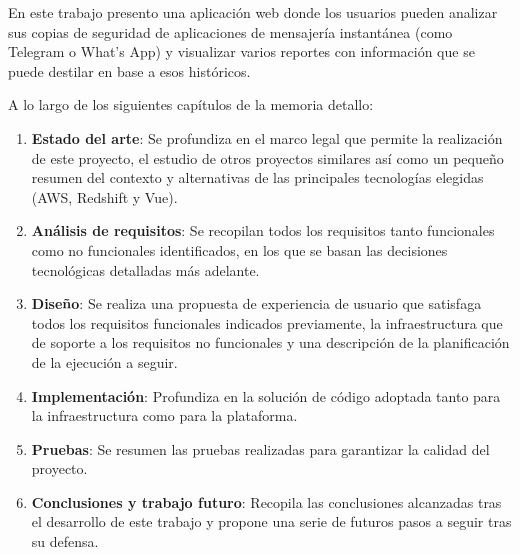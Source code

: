 
En este trabajo presento una aplicación web donde los usuarios pueden analizar sus copias de seguridad de aplicaciones de mensajería instantánea (como Telegram o What's App) y visualizar varios reportes con información que se puede destilar en base a esos históricos.

A lo largo de los siguientes capítulos de la memoria detallo:
\begin{enumerate}
    \item \textbf{Estado del arte}: Se profundiza en el marco legal que permite la realización de este proyecto, el estudio de otros proyectos similares así como un pequeño resumen del contexto y alternativas de las principales tecnologías elegidas (AWS, Redshift y Vue).
    \item \textbf{Análisis de requisitos}: Se recopilan todos los requisitos tanto funcionales como no funcionales identificados, en los que se basan las decisiones tecnológicas detalladas más adelante.
    \item \textbf{Diseño}: Se realiza una propuesta de experiencia de usuario que satisfaga todos los requisitos funcionales indicados previamente, la infraestructura que de soporte a los requisitos no funcionales y una descripción de la planificación de la ejecución a seguir.
    \item \textbf{Implementación}: Profundiza en la solución de código adoptada tanto para la infraestructura como para la plataforma.
    \item \textbf{Pruebas}: Se resumen las pruebas realizadas para garantizar la calidad del proyecto.
    \item \textbf{Conclusiones y trabajo futuro}: Recopila las conclusiones alcanzadas tras el desarrollo de este trabajo y propone una serie de futuros pasos a seguir tras su defensa.
\end{enumerate}

